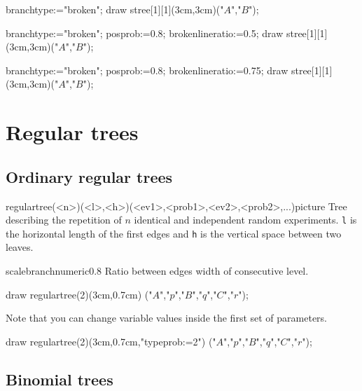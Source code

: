 \documentclass[11pt,a4paper,english]{article}
\begin{document}
\begin{exemple}[lefthand ratio=0.6]
 branchtype:="broken";
 draw stree[1][1](3cm,3cm)("$A$","$B$");
\end{exemple}

\begin{exemple}[lefthand ratio=0.6]
 branchtype:="broken";
 posprob:=0.8;
 brokenlineratio:=0.5;
 draw stree[1][1](3cm,3cm)("$A$","$B$");
\end{exemple}


\begin{exemple}[lefthand ratio=0.6]
 branchtype:="broken";
 posprob:=0.8;
 brokenlineratio:=0.75;
 draw stree[1][1](3cm,3cm)("$A$","$B$");
\end{exemple}



\section{Regular trees}
\subsection{Ordinary regular trees}

\begin{rpobjet}{regulartree(<n>)(<l>,<h>)(<ev1>,<prob1>,<ev2>,<prob2>,...)}{picture}
Tree describing the repetition of $n$ identical and independent random experiments. \verb|l| is the horizontal length of the first edges and \verb|h| is the vertical space between two leaves.
\end{rpobjet}

\begin{mptparam}{scalebranch}{numeric}{0.8}
Ratio between edges width of consecutive level.
\end{mptparam}

\begin{exemple}[lefthand ratio=0.6]
draw regulartree(2)(3cm,0.7cm)
              ("$A$","$p$","$B$","$q$","$C$","$r$");
\end{exemple}

Note that you can change variable values inside the first set of parameters.

\begin{exemple}[lefthand ratio=0.6]
draw regulartree(2)(3cm,0.7cm,"typeprob:=2")
              ("$A$","$p$","$B$","$q$","$C$","$r$");
\end{exemple}


\subsection{Binomial trees}
\end{document}
